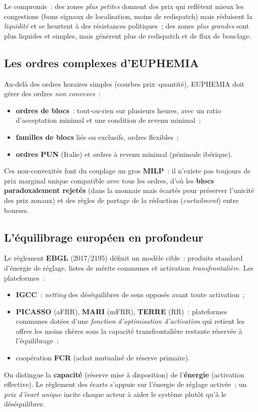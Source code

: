 \documentclass[11pt,a4paper]{article}
\begin{document}
\noindent Le compromis~: des zones \emph{plus petites} donnent des prix qui
reflètent mieux les congestions (bons signaux de localisation, moins de
redispatch) mais réduisent la \emph{liquidité} et se heurtent à des résistances
politiques~; des zones \emph{plus grandes} sont plus liquides et simples, mais
génèrent plus de redispatch et de flux de bouclage.

\subsection{Les ordres complexes d'EUPHEMIA}
\label{sec:ordres}

Au-delà des ordres horaires simples (courbes prix--quantité), EUPHEMIA doit
gérer des ordres \emph{non convexes}~:
\begin{itemize}[nosep,leftmargin=1.4em]
  \item \textbf{ordres de blocs}~: tout-ou-rien sur plusieurs heures, avec un
        ratio d'acceptation minimal et une condition de revenu minimal~;
  \item \textbf{familles de blocs} liés ou exclusifs, ordres flexibles~;
  \item \textbf{ordres PUN} (Italie) et ordres à revenu minimal (péninsule
        ibérique).
\end{itemize}
Ces non-convexités font du couplage un gros \textbf{MILP}~: il n'existe pas
toujours de prix marginal unique compatible avec tous les ordres, d'où les
\textbf{blocs paradoxalement rejetés} (dans la monnaie mais écartés pour
préserver l'unicité des prix zonaux) et des règles de partage de la réduction
(\emph{curtailment}) entre bourses.

\subsection{L'équilibrage européen en profondeur}
\label{sec:balancing-eu}

Le règlement \textbf{EBGL} (2017/2195) définit un modèle cible~: produits
standard d'énergie de réglage, listes de mérite communes et activation
\emph{transfrontalière}. Les plateformes~:
\begin{itemize}[nosep,leftmargin=1.4em]
  \item \textbf{IGCC}~: \emph{netting} des déséquilibres de sens opposés avant
        toute activation~;
  \item \textbf{PICASSO} (aFRR), \textbf{MARI} (mFRR), \textbf{TERRE} (RR)~:
        plateformes communes dotées d'une \emph{fonction d'optimisation
        d'activation} qui retient les offres les moins chères sous la capacité
        transfrontalière restante réservée à l'équilibrage~;
  \item coopération \textbf{FCR} (achat mutualisé de réserve primaire).
\end{itemize}
On distingue la \textbf{capacité} (réserve mise à disposition) de
l'\textbf{énergie} (activation effective). Le règlement des écarts s'appuie sur
l'énergie de réglage activée~; un \emph{prix d'écart unique} incite chaque
acteur à aider le système plutôt qu'à le déséquilibrer.
\end{document}
